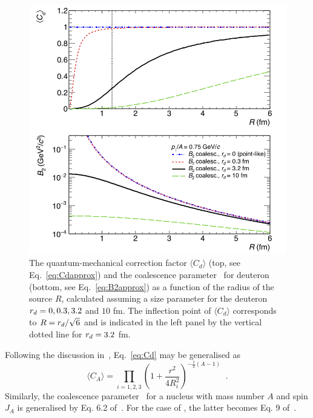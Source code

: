 \begin{figure}[hb]
\begin{center}
\includegraphics[width=\columnwidth]{../theory_coalescence_Cd_B2_vert.png}
\caption{{The quantum-mechanical correction factor $\langle C_{d} \rangle$ (top, see Eq.~\ref{eq:Cdapprox}) and the coalescence parameter \btwo~for deuteron (bottom, see Eq.~\ref{eq:B2approx}) as a function of the radius of the source $R$, calculated assuming a size parameter for the deuteron $r_{d} = 0, 0.3, 3.2$ and $10$ fm. The inflection point of $\langle C_{d} \rangle$ corresponds to $R = r_{d}/\sqrt{6}$ and is indicated in the left panel by the vertical dotted line for $r_{d} = 3.2$ fm.}}
\label{fig:radiusDependence}
\end{center}
\end{figure}   

Following the discussion in~\cite{Blum:2017qnn}, Eq.~\ref{eq:Cd} may be generalised as 
%
\begin{equation}
\langle C_{A} \rangle = \prod_{i=1,2,3} \left(1 + \frac{r^2}{4R_{i}^2} \right)^{-\frac{1}{2}(A-1)} \;\; .
\label{eq:CA_general}
\end{equation}
%
Similarly, the coalescence parameter \bA~for a nucleus with mass number $A$ and spin $J_{A}$ is generalised by Eq. 6.2 of~\cite{Scheibl:1998tk}.
For the case of \hethree, the latter becomes Eq. 9 of~\cite{Blum:2017qnn}.

